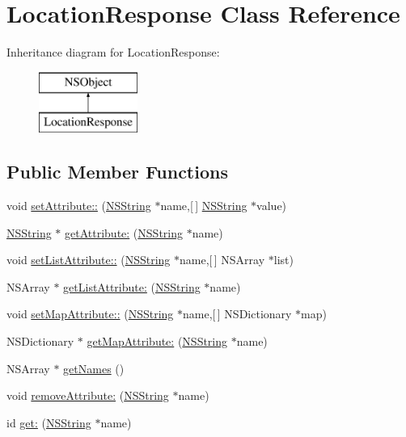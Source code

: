 \hypertarget{interface_location_response}{
\section{\-Location\-Response \-Class \-Reference}
\label{interface_location_response}
}
\-Inheritance diagram for \-Location\-Response\-:\begin{figure}[H]
\begin{center}
\leavevmode
\includegraphics[height=2.000000cm]{interface_location_response}
\end{center}
\end{figure}
\subsection*{\-Public \-Member \-Functions}
\begin{DoxyCompactItemize}
\item 
void \hyperlink{interface_location_response_aae4db6f7a8388d784b29f94183085924}{set\-Attribute\-::} (\hyperlink{class_n_s_string}{\-N\-S\-String} $\ast$name,\mbox{[}$\,$\mbox{]} \hyperlink{class_n_s_string}{\-N\-S\-String} $\ast$value)
\item 
\hyperlink{class_n_s_string}{\-N\-S\-String} $\ast$ \hyperlink{interface_location_response_a98189294fe127b441493a44deb7ae180}{get\-Attribute\-:} (\hyperlink{class_n_s_string}{\-N\-S\-String} $\ast$name)
\item 
void \hyperlink{interface_location_response_a41a521860c8ced0699964af8dab98d4c}{set\-List\-Attribute\-::} (\hyperlink{class_n_s_string}{\-N\-S\-String} $\ast$name,\mbox{[}$\,$\mbox{]} \-N\-S\-Array $\ast$list)
\item 
\-N\-S\-Array $\ast$ \hyperlink{interface_location_response_a27fba83b06df99c402f7b442782c2a2a}{get\-List\-Attribute\-:} (\hyperlink{class_n_s_string}{\-N\-S\-String} $\ast$name)
\item 
void \hyperlink{interface_location_response_a79265910e97c3f428df2e0fa91dfa702}{set\-Map\-Attribute\-::} (\hyperlink{class_n_s_string}{\-N\-S\-String} $\ast$name,\mbox{[}$\,$\mbox{]} \-N\-S\-Dictionary $\ast$map)
\item 
\-N\-S\-Dictionary $\ast$ \hyperlink{interface_location_response_acd0fa9d05aad8ac28d3317c10484239a}{get\-Map\-Attribute\-:} (\hyperlink{class_n_s_string}{\-N\-S\-String} $\ast$name)
\item 
\-N\-S\-Array $\ast$ \hyperlink{interface_location_response_adb571107d73aa55ae27c16d217b49261}{get\-Names} ()
\item 
void \hyperlink{interface_location_response_a2523a8a5bf0d30f6aeeced53383dfff5}{remove\-Attribute\-:} (\hyperlink{class_n_s_string}{\-N\-S\-String} $\ast$name)
\item 
id \hyperlink{interface_location_response_a1ae29d71506b1e80c585b31a104b726e}{get\-:} (\hyperlink{class_n_s_string}{\-N\-S\-String} $\ast$name)
\end{DoxyCompactItemize}
